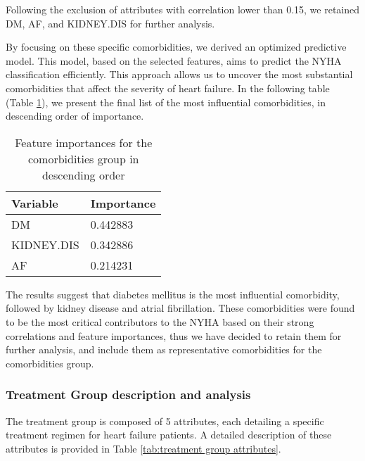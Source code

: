   Following the exclusion of attributes with correlation lower than 0.15, we retained DM, AF, and KIDNEY.DIS for further analysis.

  By focusing on these specific comorbidities, we derived an optimized predictive model. This model, based on the selected features, aims to predict the NYHA classification efficiently. This approach allows us to uncover the most substantial comorbidities that affect the severity of heart failure. In the following table (Table \ref{tab:comorbidities group feature importances}), we present the final list of the most influential comorbidities, in descending order of importance.

  \begin{table}[H]
    \centering
    \caption{Feature importances for the comorbidities group in descending order}
    \label{tab:comorbidities group feature importances}
    \begin{adjustbox}{center}
    \begin{tabular}{|l|l|}
    \hline
    \textbf{Variable} & \textbf{Importance} \\ \hline
    DM & 0.442883 \\
    KIDNEY.DIS & 0.342886 \\
    AF & 0.214231 \\ \hline
    \end{tabular}
    \end{adjustbox}
  \end{table}

  The results suggest that diabetes mellitus is the most influential comorbidity, followed by kidney disease and atrial fibrillation. These comorbidities were found to be the most critical contributors to the NYHA based on their strong correlations and feature importances, thus we have decided to retain them for further analysis, and include them as representative comorbidities for the comorbidities group.

\subsubsection{Treatment Group description and analysis}

        The treatment group is composed of 5 attributes, each detailing a specific treatment regimen for heart failure patients. A detailed description of these attributes is provided in Table \ref{tab:treatment group attributes}.


